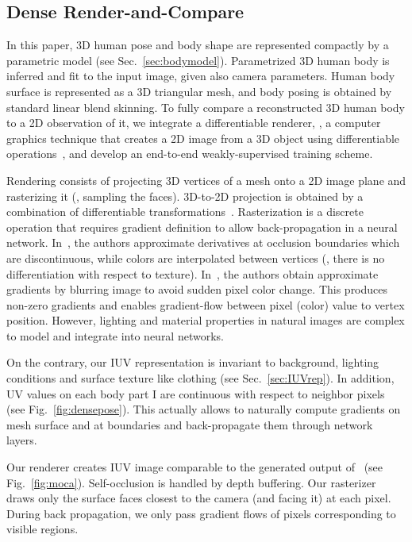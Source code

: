 \documentclass[10pt,twocolumn,letterpaper]{article}
\newcommand{\beforesubsection}{\vspace{0mm}}
\newcommand{\aftersubsection}{\vspace{0mm}}
\begin{document}
\beforesubsection
\subsection{Dense Render-and-Compare} \label{sec:randc}
\aftersubsection

In this paper, 3D human pose and body shape are represented compactly by a parametric model (see Sec.~\ref{sec:bodymodel}).
Parametrized 3D human body is inferred and fit to the input image, given also camera parameters.
Human body surface is represented as a 3D triangular mesh, and body posing is obtained by standard linear blend skinning.
To fully compare a reconstructed 3D human body to a 2D observation of it, we integrate a differentiable renderer, \ie, a computer graphics technique that creates a 2D image from a 3D object using differentiable operations~\cite{loper2014opendr,kato2018renderer}, and develop an end-to-end weakly-supervised training scheme.

Rendering consists of projecting 3D vertices of a mesh onto a 2D image plane and rasterizing it (\ie, sampling the faces).
3D-to-2D projection is obtained by a combination of differentiable transformations~\cite{marschner2015}.
Rasterization is a discrete operation that requires gradient definition to allow back-propagation in a neural network. 
In~\cite{loper2014opendr}, the authors approximate derivatives at occlusion boundaries which are discontinuous, while colors are interpolated between vertices (\ie, there is no differentiation with respect to texture).
In~\cite{kato2018renderer}, the authors obtain approximate gradients by blurring image to avoid sudden pixel color change. This produces non-zero gradients and enables gradient-flow between pixel (color) value to vertex position.
However, lighting and material properties in natural images are complex to model and integrate into neural networks.

On the contrary, our IUV representation is invariant to background, lighting conditions and surface texture like clothing (see Sec.~\ref{sec:IUVrep}).
In addition, UV values on each body part I are continuous with respect to neighbor pixels (see Fig.~\ref{fig:densepose}).
This actually allows to naturally compute gradients on mesh surface and at boundaries and back-propagate them through network layers.

Our renderer creates IUV image comparable to the generated output of~\cite{DensePose2018} (see Fig.~\ref{fig:moca}).
Self-occlusion is handled by depth buffering. Our rasterizer draws only the surface faces closest to the camera (and facing it) at each pixel.
During back propagation, we only pass gradient flows of pixels corresponding to visible regions.
\end{document}
